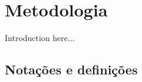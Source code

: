 \chapter{Metodologia} \label{chap:method}

Introduction here...

\section{Nota\c c\~ oes e defini\c c\~ oes} \label{notation}
